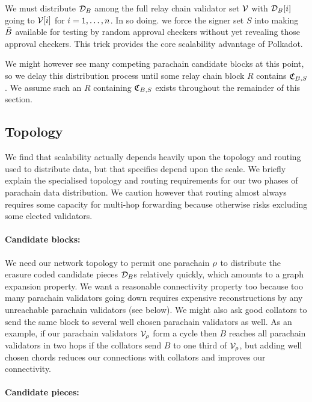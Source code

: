 We must distribute $\mathcal{D}_B$ among the full relay chain validator set $\mathcal{V}$ with $\mathcal{D}_B[i]$ going to $\mathcal{V}[i]$ for $i = 1,\ldots,n$.  In so doing. we force the signer set $S$ into making $\bar{B}$ available for testing by random approval checkers without yet revealing those approval checkers.  This trick provides the core scalability advantage of Polkadot.

We might however see many competing parachain candidate blocks at this point, so we delay this distribution process until some relay chain block $R$ contains $\mathfrak{C}_{B,S}$.  We assume such an $R$ containing $\mathfrak{C}_{B,S}$ exists throughout the remainder of this section.


\subsection{Topology}

We find that scalability actually depends heavily upon the topology and routing used to distribute data, but that specifics depend upon the scale.  We briefly explain the specialised topology and routing requirements for our two phases of parachain data distribution.  We caution however that routing almost always requires some capacity for multi-hop forwarding because otherwise risks excluding some elected validators.  

\smallskip
\paragraph{Candidate blocks:}

We need our network topology to permit one parachain $\rho$ to distribute the erasure coded candidate pieces $\mathcal{D}_B$s relatively quickly, which amounts to a graph expansion property.  We want a reasonable connectivity property too because too many parachain validators going down requires expensive reconstructions by any unreachable parachain validators (see  below).  We might also ask good collators to send the same block to several well chosen parachain validators as well.  As an example, if our parachain validators $\mathcal{V}_{\rho}$ form a cycle then $B$ reaches all parachain validators in two hops if the collators send $B$ to one third of $\mathcal{V}_{\rho}$, but adding well chosen chords reduces our connections with collators and improves our connectivity.  

\smallskip
\paragraph{Candidate pieces:}

